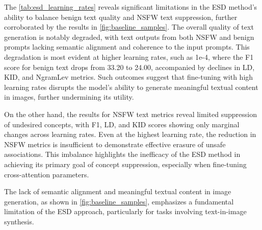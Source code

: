 The \cref{tab:esd_learning_rates} reveals significant limitations in the ESD method's ability to balance benign text quality and NSFW text suppression, further corroborated by the results in \cref{fig:baseline_samples}. The overall quality of text generation is notably degraded, with text outputs from both NSFW and benign prompts lacking semantic alignment and coherence to the input prompts. This degradation is most evident at higher learning rates, such as 1e-4, where the F1 score for benign text drops from 33.20 to 24.00, accompanied by declines in LD, KID, and NgramLev metrics. Such outcomes suggest that fine-tuning with high learning rates disrupts the model's ability to generate meaningful textual content in images, further undermining its utility.

On the other hand, the results for NSFW text metrics reveal limited suppression of undesired concepts, with F1, LD, and KID scores showing only marginal changes across learning rates. Even at the highest learning rate, the reduction in NSFW metrics is insufficient to demonstrate effective erasure of unsafe associations. This imbalance highlights the inefficacy of the ESD method in achieving its primary goal of concept suppression, especially when fine-tuning cross-attention parameters.

The lack of semantic alignment and meaningful textual content in image generation, as shown in \cref{fig:baseline_samples}, emphasizes a fundamental limitation of the ESD approach, particularly for tasks involving text-in-image synthesis.


